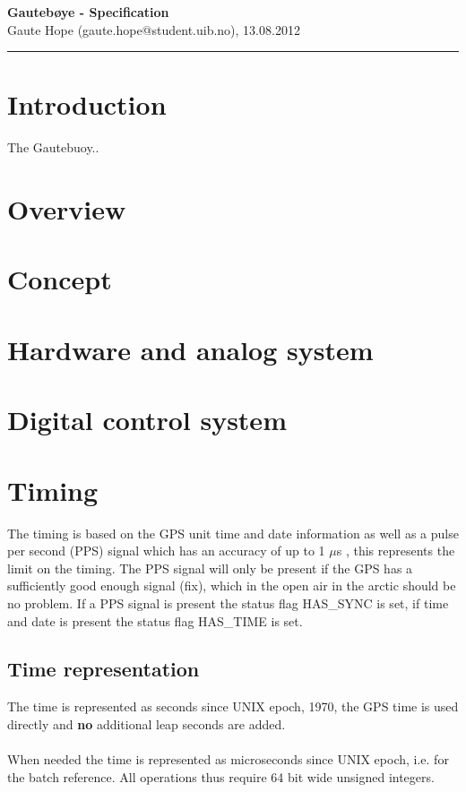 \documentclass[a4paper]{article}
\newcommand{\makeheading}[2]%
        {\hspace*{-\marginparsep minus \marginparwidth}%
         \begin{minipage}[t]{\textwidth\marginparwidth\marginparsep}%
           {\large \bfseries #1}\\{#2}\\[-0.15\baselineskip]%
                 \rule{\columnwidth}{1pt}%
         \end{minipage}}
\begin{document}
\makeheading{Gautebøye - Specification}{Gaute Hope
(gaute.hope@student.uib.no), 13.08.2012}

\vspace{2em}
\section*{Introduction}
The Gautebuoy..

\vspace{2em}

\begin{multicols}{2}
  \section{Overview}

  \section{Concept}

  \section{Hardware and analog system}

  \section{Digital control system}

  \section{Timing}
  The timing is based on the GPS unit time and date information as well
  as a pulse per second (PPS) signal which has an accuracy of up to 1
  $\mu$s \cite{em_406A_gps_ds}, this represents the limit on the timing. The PPS signal will
  only be present if the GPS has a sufficiently good enough signal (fix),
  which in the open air in the arctic should be no problem. If a PPS
  signal is present the status flag HAS\_SYNC is set, if time and date
  is present the status flag HAS\_TIME is set.

  \subsection{Time representation}
  The time is represented as seconds since UNIX epoch, 1970, the GPS
  time is used directly and \textbf{no} additional leap seconds are added.

  \paragraph{}When needed the time is represented as microseconds since
  UNIX epoch, i.e. for the batch reference. All operations thus require
  64 bit wide unsigned integers.


\end{multicols}
\end{document}
